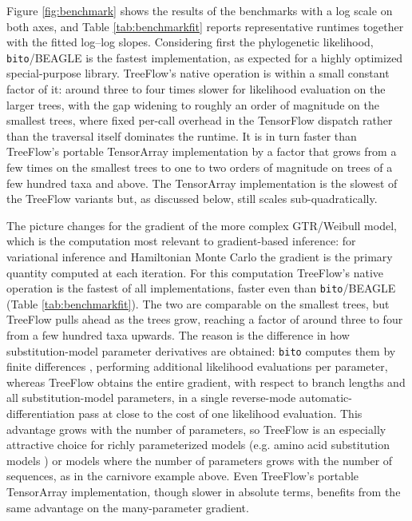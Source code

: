 \documentclass[oupdraft]{sysbio_sse}
\let\cite\citep
\begin{document}
Figure \ref{fig:benchmark} shows the results of the benchmarks with a log scale on both axes, and Table \ref{tab:benchmarkfit} reports representative runtimes together with the fitted log--log slopes. Considering first the phylogenetic likelihood, \texttt{bito}/BEAGLE is the fastest implementation, as expected for a highly optimized special-purpose library. TreeFlow's native operation is within a small constant factor of it: around three to four times slower for likelihood evaluation on the larger trees, with the gap widening to roughly an order of magnitude on the smallest trees, where fixed per-call overhead in the TensorFlow dispatch rather than the traversal itself dominates the runtime. It is in turn faster than TreeFlow's portable TensorArray implementation by a factor that grows from a few times on the smallest trees to one to two orders of magnitude on trees of a few hundred taxa and above. The TensorArray implementation is the slowest of the TreeFlow variants but, as discussed below, still scales sub-quadratically.

The picture changes for the gradient of the more complex GTR/Weibull model, which is the computation most relevant to gradient-based inference: for variational inference and Hamiltonian Monte Carlo the gradient is the primary quantity computed at each iteration. For this computation TreeFlow's native operation is the fastest of all implementations, faster even than \texttt{bito}/BEAGLE (Table \ref{tab:benchmarkfit}). The two are comparable on the smallest trees, but TreeFlow pulls ahead as the trees grow, reaching a factor of around three to four from a few hundred taxa upwards. The reason is the difference in how substitution-model parameter derivatives are obtained: \texttt{bito} computes them by finite differences \cite{fourment2023automatic}, performing additional likelihood evaluations per parameter, whereas TreeFlow obtains the entire gradient, with respect to branch lengths and all substitution-model parameters, in a single reverse-mode automatic-differentiation pass at close to the cost of one likelihood evaluation. This advantage grows with the number of parameters, so TreeFlow is an especially attractive choice for richly parameterized models (e.g. amino acid substitution models \cite{adachi1996model}) or models where the number of parameters grows with the number of sequences, as in the carnivore example above. Even TreeFlow's portable TensorArray implementation, though slower in absolute terms, benefits from the same advantage on the many-parameter gradient.
\end{document}
